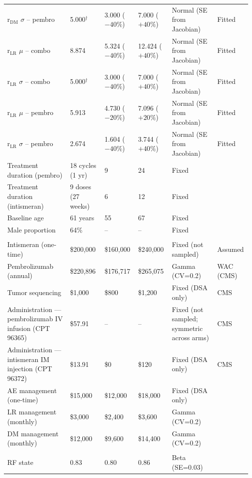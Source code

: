 \documentclass[11pt,a4paper]{article}
\begin{document}
\begin{landscape}
\begin{table}[p]
\begin{tabularx}{\linewidth}{@{}>{\raggedright\arraybackslash}Xlll>{\raggedright\arraybackslash}Xl@{}}
r$_{\text{DM}}$ $\sigma$ -- pembro & 5.000$^{\dagger}$ & 3.000 ($-40\%$) & 7.000 ($+40\%$) & Normal (SE from Jacobian) & Fitted \\
r$_{\text{LR}}$ $\mu$ -- combo & 8.874 & 5.324 ($-40\%$) & 12.424 ($+40\%$) & Normal (SE from Jacobian) & Fitted \\
r$_{\text{LR}}$ $\sigma$ -- combo & 5.000$^{\dagger}$ & 3.000 ($-40\%$) & 7.000 ($+40\%$) & Normal (SE from Jacobian) & Fitted \\
r$_{\text{LR}}$ $\mu$ -- pembro & 5.913 & 4.730 ($-20\%$) & 7.096 ($+20\%$) & Normal (SE from Jacobian) & Fitted \\
r$_{\text{LR}}$ $\sigma$ -- pembro & 2.674 & 1.604 ($-40\%$) & 3.744 ($+40\%$) & Normal (SE from Jacobian) & Fitted \\
Treatment duration (pembro) & 18 cycles (1 yr) & 9 & 24 & Fixed & \cite{khattak2026} \\
Treatment duration (intismeran) & 9 doses (27 weeks) & 6 & 12 & Fixed & \cite{khattak2026} \\
Baseline age & 61 years & 55 & 67 & Fixed & \cite{khattak2026} \\
Male proportion & 64\% & -- & -- & Fixed & \cite{khattak2026} \\
\midrule
\multicolumn{6}{c}{\textit{Costs (2026 USD)}} \\
Intismeran (one-time) & \$200,000 & \$160,000 & \$240,000 & Fixed (not sampled) & Assumed \\
Pembrolizumab (annual) & \$220,896 & \$176,717 & \$265,075 & Gamma (CV=0.2) & WAC (CMS) \\
Tumor sequencing & \$1,000 & \$800 & \$1,200 & Fixed (DSA only) & CMS \\
Administration --- \mbox{pembrolizumab} IV infusion (CPT 96365) & \$57.91 & -- & -- & Fixed (not sampled; symmetric across arms) & CMS \\
Administration --- intismeran IM injection (CPT 96372) & \$13.91 & \$0 & \$120 & Fixed (DSA only) & CMS \\
AE management (one-time) & \$15,000 & \$12,000 & \$18,000 & Fixed (DSA only) & \cite{zhang2023} \\
LR management (monthly) & \$3,000 & \$2,400 & \$3,600 & Gamma (CV=0.2) & \cite{zhang2023} \\
DM management (monthly) & \$12,000 & \$9,600 & \$14,400 & Gamma (CV=0.2) & \cite{bensimon2019} \\
\midrule
\multicolumn{6}{c}{\textit{Utilities}} \\
RF state & 0.83 & 0.80 & 0.86 & Beta (SE=0.03) & \cite{tran2021} \\

\end{tabularx}
\end{table}
\end{landscape}
\end{document}
